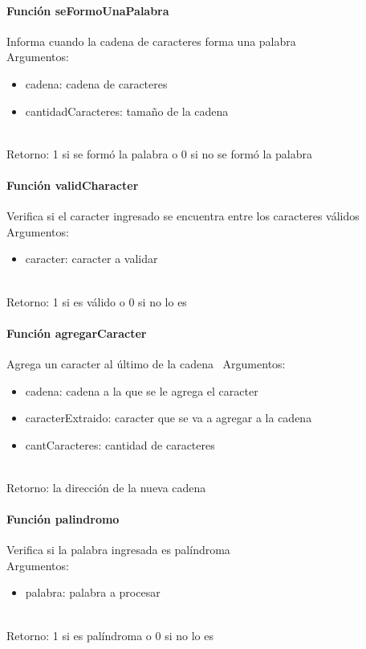 \documentclass[a4paper]{article}
\begin{document}
\paragraph{Función seFormoUnaPalabra}
Informa cuando la cadena de caracteres forma una palabra \\
Argumentos:
	\begin{itemize}
	\item cadena: cadena de caracteres
	\item cantidadCaracteres: tamaño de la cadena
	\end{itemize} \\
Retorno: 1 si se formó la palabra o 0 si no se formó la palabra


\paragraph{Función validCharacter}
Verifica si el caracter ingresado se encuentra entre los caracteres válidos \\
Argumentos:
\begin{itemize}
	\item caracter: caracter a validar
	\end{itemize} \\
Retorno: 1 si es válido o 0 si no lo es


\paragraph{Función agregarCaracter}
Agrega un caracter al último de la cadena \
Argumentos:
\begin{itemize}
	\item cadena: cadena a la que se le agrega el caracter
	\item caracterExtraido: caracter que se va a agregar a la cadena
	\item cantCaracteres: cantidad de caracteres
	\end{itemize} \\
Retorno: la dirección de la nueva cadena


\paragraph{Función palindromo}
Verifica si la palabra ingresada es palíndroma \\
Argumentos:
\begin{itemize} 
	\item palabra: palabra a procesar 
\end{itemize} \\
Retorno: 1 si es palíndroma o 0 si no lo es
\end{document}
